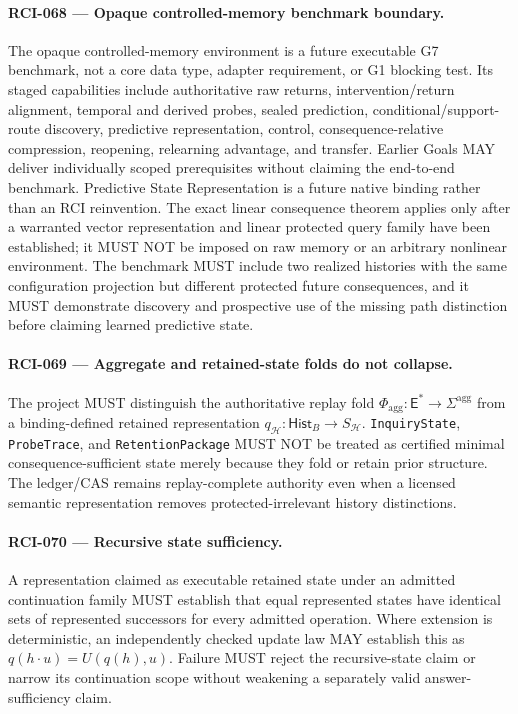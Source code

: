 \documentclass[11pt]{article}
\begin{document}
\paragraph{RCI-068 --- Opaque controlled-memory benchmark boundary.}
The opaque controlled-memory environment is a future executable G7 benchmark,
not a core data type, adapter requirement, or G1 blocking test. Its staged
capabilities include authoritative raw returns, intervention/return alignment,
temporal and derived probes, sealed prediction, conditional/support-route
discovery, predictive representation, control, consequence-relative
compression, reopening, relearning advantage, and transfer. Earlier Goals MAY
deliver individually scoped prerequisites without claiming the end-to-end
benchmark. Predictive State Representation is a future native binding rather
than an RCI reinvention. The exact linear consequence theorem applies only after
a warranted vector representation and linear protected query family have been
established; it MUST NOT be imposed on raw memory or an arbitrary nonlinear
environment.
The benchmark MUST include two realized histories with the same configuration
projection but different protected future consequences, and it MUST demonstrate
discovery and prospective use of the missing path distinction before claiming
learned predictive state.

\paragraph{RCI-069 --- Aggregate and retained-state folds do not collapse.}
The project MUST distinguish the authoritative replay fold
$\Phi_{\mathrm{agg}}:\mathsf E^*\to\Sigma^{\mathrm{agg}}$ from a
binding-defined retained representation
$q_{\mathcal H}:\mathsf{Hist}_B\to S_{\mathcal H}$. \texttt{InquiryState},
\texttt{ProbeTrace}, and \texttt{RetentionPackage} MUST NOT be treated as
certified minimal consequence-sufficient state merely because they fold or
retain prior structure. The ledger/CAS remains replay-complete authority even
when a licensed semantic representation removes protected-irrelevant history
distinctions.

\paragraph{RCI-070 --- Recursive state sufficiency.}
A representation claimed as executable retained state under an admitted
continuation family MUST establish that equal represented states have identical
sets of represented successors for every admitted operation. Where extension is
deterministic, an independently checked update law MAY establish this as
$q(h\mathbin{\cdot}u)=U(q(h),u)$. Failure MUST reject the recursive-state claim
or narrow its continuation scope without weakening a separately valid answer-
sufficiency claim.
\end{document}
